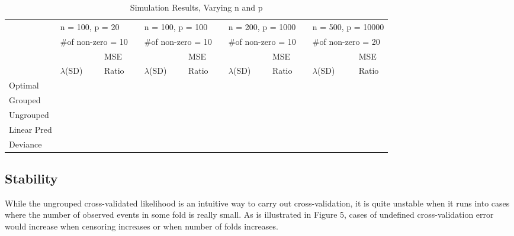 \documentclass{article}\usepackage[]{graphicx}\usepackage[]{color}
\begin{document}
\begin{table}[h]
\small
\centering
\caption{Simulation Results, Varying n and p}
\label{my-label}
\begin{tabular}{llllllllllllllll}
\hline
       & \multicolumn{3}{l}{n = 100, p = 20} &  & \multicolumn{3}{l}{n = 100, p = 100} &  & \multicolumn{3}{l}{n = 200, p = 1000} &  & \multicolumn{3}{l}{n = 500, p = 10000} \\
       & \multicolumn{3}{l}{$\#$of non-zero = 10} &  & \multicolumn{3}{l}{$\#$of non-zero = 10} &  & \multicolumn{3}{l}{$\#$of non-zero = 10} &  & \multicolumn{3}{l}{$\#$of non-zero = 20} \\ \cline{2-4} \cline{6-8} \cline{10-12} \cline{14-16} 
       &     &        &MSE       &  &   &       & MSE     &    &    &        & MSE      &  &     &        & MSE      \\
       & $\lambda$(SD)     & &Ratio       &  & $\lambda$(SD)         & & Ratio     & &$\lambda$(SD)         & & Ratio      & & $\lambda$(SD)         & & Ratio      \\ \cline{2-2} \cline{4-4} \cline{6-6} \cline{8-8} \cline{10-10} \cline{12-12} \cline{14-14} \cline{16-16} 
Optimal &           &        &          &  &           &       &          &  &           &        &          &  &           &        &          \\
Grouped &           &        &          &  &           &       &          &  &           &        &          &  &           &        &          \\
Ungrouped &           &        &          &  &           &       &          &  &           &        &          &  &           &        &          \\
Linear Pred &           &        &          &  &           &       &          &  &           &        &          &  &           &        &          \\
Deviance &           &        &          &  &           &       &          &  &           &        &          &  &           &        &          \\ \hline
\end{tabular}
\end{table}


 \subsection {Stability}
   While the ungrouped cross-validated likelihood is an intuitive way to carry out cross-validation, it is quite unstable when it runs into cases where the number of observed events in some fold is really small. As is illustrated in Figure 5, cases of undefined cross-validation error would increase when censoring increases or when number of folds increases. 
\end{document}
